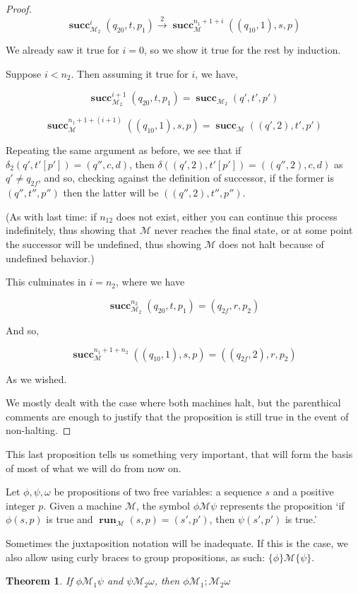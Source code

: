 \documentclass{article}
\newtheorem{theorem}{Theorem}
\newcommand{\M}{\mathcal{M}}
\newcommand{\prarrow}[1]{\overset{#1}{\rightarrow}}
\DeclareMathOperator{\suc}{\mathbf{succ}}
\DeclareMathOperator{\run}{\mathbf{run}}
\begin{document}
\begin{proof}
	\[\suc^{i}_{\M_2} (q_{20}, t, p_1) \prarrow{2} \suc^{n_1+1+i}_{\M} ((q_{10}, 1), s, p)\]
	
	We already saw it true for $i=0$, so we show it true for the rest by induction.
	
	Suppose $i < n_2$. Then assuming it true for $i$, we have,
	
	\[\suc^{i+1}_{\M_2} (q_{20}, t, p_1) = \suc_{\M_2} (q', t', p')\]
	
	\[\suc^{n_1+1+(i+1)}_{\M} ((q_{10}, 1), s, p) = \suc_{\M} ((q', 2), t', p')\]
	
	Repeating the same argument as before, we see that if $\delta_2(q', t'[p']) = (q'', c, d)$, then $\delta((q',2), t'[p']) = ((q'', 2), c, d)$ as $q' \neq q_{2f}$, and so, checking against the definition of successor, if the former is $(q'', t'', p'')$ then the latter will be $((q'', 2), t'', p'')$.
	
	(As with last time: if $n_12$ does not exist, either you can continue this process indefinitely, thus showing that $\M$ never reaches the final state, or at some point the successor will be undefined, thus showing $\M$ does not halt because of undefined behavior.)
	
	This culminates in $i = n_2$, where we have
	
	\[\suc^{n_2}_{\M_2} (q_{20}, t, p_1) = (q_{2f}, r, p_2)\]
	
	And so,
	
	\[\suc^{n_1 + 1 + n_2}_{\M} ((q_{10},1), s, p) = ((q_{2f},2), r, p_2)\]
	
	As we wished.
	
	We mostly dealt with the case where both machines halt, but the parenthical comments are enough to justify that the proposition is still true in the event of non-halting.
	\end{proof}
	
	This last proposition tells us something very important, that will form the basis of most of what we will do from now on.
	
	Let $\phi, \psi, \omega$ be propositions of two free variables: a sequence $s$ and a positive integer $p$. Given a machine $\M$, the symbol $\phi\M\psi$ represents the proposition `if $\phi(s,p)$ is true and $\run_\M(s, p) = (s', p')$, then $\psi(s', p')$ is true.'
	
	Sometimes the juxtaposition notation will be inadequate. If this is the case, we also allow using curly braces to group propositions, as such: $\{\phi\}\M\{\psi\}$.
	
	
	\begin{theorem}
	If $\phi \M_1 \psi$ and $\psi \M_2 \omega$, then $\phi \M_1;\M_2 \omega$
	\end{theorem}
	
\end{document}
